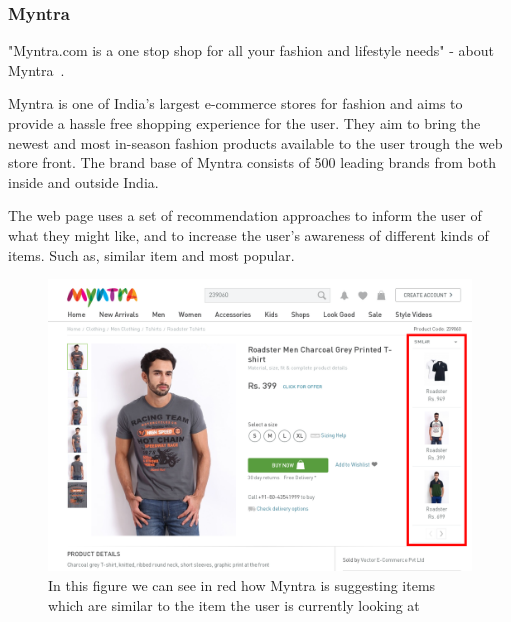 \subsubsection{Myntra} %
\label{par:myntra}
    "Myntra.com is a one stop shop for all your fashion and lifestyle needs" - about Myntra~\cite{myntra}.

    Myntra is one of India's largest e-commerce stores for fashion and aims to  provide a hassle free shopping experience for the user.
    They aim to bring the newest and most in-season fashion products available to the user trough the web store front.
    The brand base of Myntra consists of 500 leading brands from both inside and outside India.

    The web page uses a set of recommendation approaches to inform the user of what they might like, and to increase the user's awareness of different kinds of items. Such as, similar item and most popular.

    \begin{figure}[H]
        \centering
        \includegraphics[width=5in]{image/myntiaSimilarExample.png}
        \caption[Example of Myntra's "similar item" approach]{In this figure we can see in red how Myntra is suggesting items which are similar to the item the user is currently looking at}
        \label{figure:myntiaSimilarEx}
    \end{figure}

